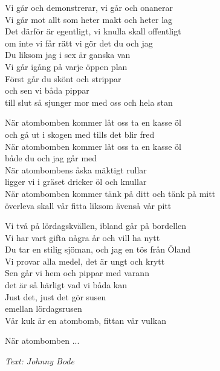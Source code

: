 \vspace{10pt}
Vi går och demonstrerar, vi går och onanerar\\
Vi går mot allt som heter makt och heter lag\\
Det därför är egentligt, vi knulla skall offentligt\\
om inte vi får rätt vi gör det du och jag\\
Du liksom jag i sex är ganska van\\
Vi går igång på varje öppen plan\\
Först går du skönt och strippar\\
och sen vi båda pippar\\
till slut så sjunger mor med oss och hela stan\par
\newpage
När atombomben kommer låt oss ta en kasse öl\\
och gå ut i skogen med tills det blir fred\\
När atombomben kommer låt oss ta en kasse öl\\
både du och jag går med\\
När atombombens åska mäktigt rullar\\
ligger vi i gräset dricker öl och knullar\\
När atombomben kommer tänk på ditt och tänk på mitt\\
överleva skall vår fitta liksom ävenså vår pitt\par
\vspace{10pt}
Vi två på lördagskvällen, ibland går på bordellen\\
Vi har vart gifta några år och vill ha nytt\\
Du tar en stilig sjöman, och jag en tös från Öland\\
Vi provar alla medel, det är ungt och krytt\\
Sen går vi hem och pippar med varann\\
det är så härligt vad vi båda kan\\
Just det, just det gör susen\\
emellan lördagsrusen\\
Vår kuk är en atombomb, fittan vår vulkan\par
\vspace{10pt}
När atombomben ...\par
\vspace{10pt}
{\footnotesize\textit{Text: Johnny Bode}}\par
